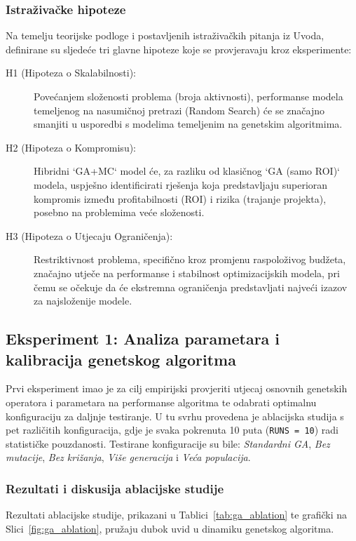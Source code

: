 \subsubsection{Istraživačke hipoteze}
Na temelju teorijske podloge i postavljenih istraživačkih pitanja iz Uvoda, definirane su sljedeće tri glavne hipoteze koje se provjeravaju kroz eksperimente:

\begin{description}
    \item[H1 (Hipoteza o Skalabilnosti):] Povećanjem složenosti problema (broja aktivnosti), performanse modela temeljenog na nasumičnoj pretrazi (Random Search) će se značajno smanjiti u usporedbi s modelima temeljenim na genetskim algoritmima.
    \item[H2 (Hipoteza o Kompromisu):] Hibridni `GA+MC` model će, za razliku od klasičnog `GA (samo ROI)` modela, uspješno identificirati rješenja koja predstavljaju superioran kompromis između profitabilnosti (ROI) i rizika (trajanje projekta), posebno na problemima veće složenosti.
    \item[H3 (Hipoteza o Utjecaju Ograničenja):] Restriktivnost problema, specifično kroz promjenu raspoloživog budžeta, značajno utječe na performanse i stabilnost optimizacijskih modela, pri čemu se očekuje da će ekstremna ograničenja predstavljati najveći izazov za najsloženije modele.
\end{description}

\subsection{Eksperiment 1: Analiza parametara i kalibracija genetskog algoritma}

Prvi eksperiment imao je za cilj empirijski provjeriti utjecaj osnovnih genetskih operatora i parametara na performanse algoritma te odabrati optimalnu konfiguraciju za daljnje testiranje. U tu svrhu provedena je ablacijska studija s pet različitih konfiguracija, gdje je svaka pokrenuta 10 puta (\texttt{RUNS = 10}) radi statističke pouzdanosti. Testirane konfiguracije su bile: \emph{Standardni GA}, \emph{Bez mutacije}, \emph{Bez križanja}, \emph{Više generacija} i \emph{Veća populacija}.

\subsubsection{Rezultati i diskusija ablacijske studije} Rezultati ablacijske studije, prikazani u Tablici~\ref{tab:ga_ablation} te grafički na Slici~\ref{fig:ga_ablation}, pružaju dubok uvid u dinamiku genetskog algoritma.

